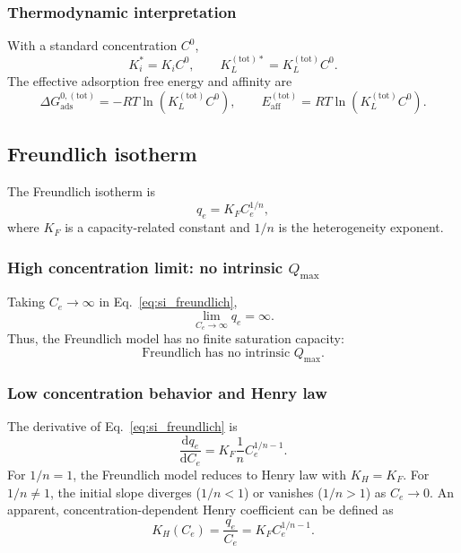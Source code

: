\documentclass[journal=aamick,manuscript=article]{achemso}
\begin{document}
\subsubsection{Thermodynamic interpretation}

With a standard concentration \(C^0\),
\begin{equation}
	K_i^{\ast} = K_i C^0,
	\qquad
	K_L^{\mathrm{(tot)}\ast} = K_L^{\mathrm{(tot)}} C^0.
\end{equation}
The effective adsorption free energy and affinity are
\begin{equation}
	\Delta G_{\mathrm{ads}}^{0,\mathrm{(tot)}}
	= - R T \ln\left( K_L^{\mathrm{(tot)}} C^0 \right),
	\qquad
	E_{\mathrm{aff}}^{\mathrm{(tot)}}
	= R T \ln\left( K_L^{\mathrm{(tot)}} C^0 \right).
\end{equation}

\subsection{Freundlich isotherm}
\label{sec:si_freundlich}

The Freundlich isotherm is
\begin{equation}
	q_e = K_F C_e^{1/n},
	\label{eq:si_freundlich}
\end{equation}
where \(K_F\) is a capacity-related constant and \(1/n\) is the
heterogeneity exponent.

\subsubsection{High concentration limit: no intrinsic \(Q_{\max}\)}

Taking \(C_e \to \infty\) in Eq.~\eqref{eq:si_freundlich},
\begin{equation}
	\lim_{C_e \to \infty} q_e = \infty.
\end{equation}
Thus, the Freundlich model has no finite saturation capacity:
\begin{equation}
	\boxed{\text{Freundlich has no intrinsic } Q_{\max}.}
\end{equation}

\subsubsection{Low concentration behavior and Henry law}

The derivative of Eq.~\eqref{eq:si_freundlich} is
\begin{equation}
	\frac{\mathrm{d} q_e}{\mathrm{d} C_e}
	= K_F \frac{1}{n} C_e^{1/n - 1}.
\end{equation}
For \(1/n = 1\), the Freundlich model reduces to Henry law with
\(K_H = K_F\). For \(1/n \neq 1\), the initial slope diverges
(\(1/n < 1\)) or vanishes (\(1/n > 1\)) as \(C_e \to 0\).
An apparent, concentration-dependent Henry coefficient can be defined as
\begin{equation}
	K_H(C_e) = \frac{q_e}{C_e}
	= K_F C_e^{1/n - 1}.
\end{equation}
\end{document}
